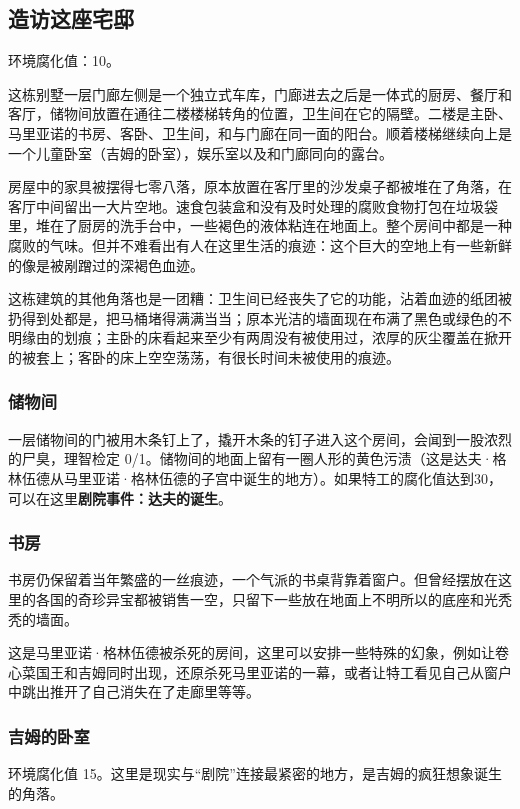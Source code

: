 \subsection{造访这座宅邸}
环境腐化值：10。

这栋别墅一层门廊左侧是一个独立式车库，门廊进去之后是一体式的厨房、餐厅和客厅，储物间放置在通往二楼楼梯转角的位置，卫生间在它的隔壁。二楼是主卧、马里亚诺的书房、客卧、卫生间，和与门廊在同一面的阳台。顺着楼梯继续向上是一个儿童卧室（吉姆的卧室），娱乐室以及和门廊同向的露台。

房屋中的家具被摆得七零八落，原本放置在客厅里的沙发桌子都被堆在了角落，在客厅中间留出一大片空地。速食包装盒和没有及时处理的腐败食物打包在垃圾袋里，堆在了厨房的洗手台中，一些褐色的液体粘连在地面上。整个房间中都是一种腐败的气味。但并不难看出有人在这里生活的痕迹：这个巨大的空地上有一些新鲜的像是被剐蹭过的深褐色血迹。

这栋建筑的其他角落也是一团糟：卫生间已经丧失了它的功能，沾着血迹的纸团被扔得到处都是，把马桶堵得满满当当；原本光洁的墙面现在布满了黑色或绿色的不明缘由的划痕；主卧的床看起来至少有两周没有被使用过，浓厚的灰尘覆盖在掀开的被套上；客卧的床上空空荡荡，有很长时间未被使用的痕迹。

\subsubsection{储物间}

一层储物间的门被用木条钉上了，撬开木条的钉子进入这个房间，会闻到一股浓烈的尸臭，理智检定 0/1。储物间的地面上留有一圈人形的黄色污渍（这是达夫·格林伍德从马里亚诺·格林伍德的子宫中诞生的地方）。如果特工的腐化值达到30，可以在这里\textbf{剧院事件：达夫的诞生}。

\subsubsection{书房}
书房仍保留着当年繁盛的一丝痕迹，一个气派的书桌背靠着窗户。但曾经摆放在这里的各国的奇珍异宝都被销售一空，只留下一些放在地面上不明所以的底座和光秃秃的墙面。

这是马里亚诺·格林伍德被杀死的房间，这里可以安排一些特殊的幻象，例如让卷心菜国王和吉姆同时出现，还原杀死马里亚诺的一幕，或者让特工看见自己从窗户中跳出推开了自己消失在了走廊里等等。

\subsubsection{吉姆的卧室}
环境腐化值 15。这里是现实与“剧院”连接最紧密的地方，是吉姆的疯狂想象诞生的角落。

